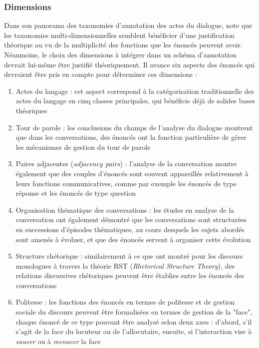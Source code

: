 \documentclass[10pt,a4paper,twoside]{article}
\begin{document}
\subsubsection{Dimensions}
\label{subsubsec:dimensions}

Dans son panorama des taxonomies d'annotation des actes du dialogue, \citet{popescu2005dialogue} note que les taxonomies multi-dimensionnelles semblent bénéficier d'une justification théorique au vu de la multiplicité des fonctions que les énoncés peuvent avoir. Néanmoins, le choix des dimensions à intégrer dans un schéma d'annotation devrait lui-même être justifié théoriquement. Il avance six aspects des énoncés qui devraient être pris en compte pour déterminer ces dimensions :

\begin{enumerate}
	\item Actes du langage : cet aspect correspond à la catégorisation traditionnelle des actes du langage en cinq classes principales, qui bénéficie déjà de solides bases théoriques \cite{austin1975how}
	\item Tour de parole : les conclusions du champs de l'analyse du dialogue montrent que dans les conversations, des énoncés ont la fonction particulière de gérer les mécanismes de gestion du tour de parole \cite{shriberg2004icsi}
	\item Paires adjacentes (\textit{adjacency pairs}) : l'analyse de la conversation montre également que des couples d'énoncés sont souvent appareillés relativement à leurs fonctions communicatives, comme par exemple les énoncés de type \og réponse \fg et les énoncés de type \og question \fg{} \cite{levinson1983pragmatics,schegloff1973opening}
	\item Organisation thématique des conversations : les études en analyse de la conversation ont également démontré que les conversations sont structurées en successions d'épisodes thématiques, au cours desquels les sujets abordés sont amenés à évoluer, et que des énoncés servent à organiser cette évolution \cite{schegloff1973opening}
	\item Structure rhétorique : similairement à ce que \citet{thompson1987rhetorical} ont montré pour les discours monologues à travers la théorie RST (\textit{Rhetorical Structure Theory}), des relations discursives rhétoriques peuvent être établies entre les énoncés des conversations \cite{asher2003logics}
	\item Politesse : les fonctions des énoncés en termes de politesse et de gestion sociale du discours peuvent être formalisées en termes de gestion de la "face", chaque énoncé de ce type pouvant être analysé selon deux axes : d'abord, s'il s'agit de la face du locuteur ou de l'allocutaire, ensuite, si l'interaction vise à \textit{sauver} ou à \textit{menacer} la face \cite{brown1987politeness}
\end{enumerate}
\end{document}
